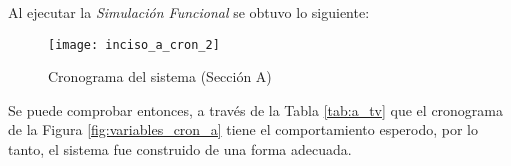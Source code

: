 \documentclass[../procedimientos.tex]{subfiles}
\begin{document}
Al ejecutar la \textit{Simulación Funcional} se obtuvo lo siguiente:
\begin{figure}[H]
  \centering
  \texttt{[image: inciso\_a\_cron\_2]}
  \caption{Cronograma del sistema (Sección A)}
  \label{fig:cron_a}
\end{figure}

Se puede comprobar entonces, a través de la Tabla \ref{tab:a_tv} que el 
cronograma de la Figura \ref{fig:variables_cron_a} tiene el comportamiento 
esperodo, por lo tanto, el sistema fue construido de una forma adecuada.
\end{document}
